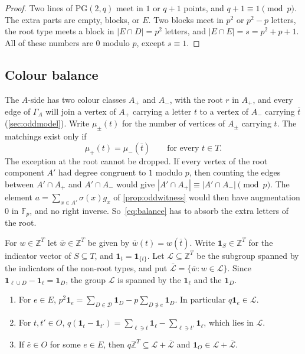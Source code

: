 \documentclass[11pt]{article}
\theoremstyle{definition}
\theoremstyle{plain}
\newcommand{\F}{\mathbb{F}}
\newcommand{\Z}{\mathbb{Z}}
\newcommand{\PG}{\mathrm{PG}}
\newcommand{\one}{\mathbf{1}}
\begin{document}
\begin{proof}
Two lines of $\PG(2,q)$ meet in $1$ or $q+1$ points, and $q+1\equiv1\pmod p$. The extra parts are empty, blocks, or $E$. Two blocks meet in $p^2$ or $p^2-p$ letters, the root type meets a block in $|E\cap D|=p^2$ letters, and $|E\cap E|=s=p^2+p+1$. All of these numbers are $0$ modulo $p$, except $s\equiv1$.
\end{proof}

\subsection{Colour balance}\label{sec:colour}

The $A$-side has two colour classes $A_+$ and $A_-$, with the root $r$ in $A_+$, and every edge of $\Gamma_A$ will join a vertex of $A_+$ carrying a letter $t$ to a vertex of $A_-$ carrying $\bar t$ (\cref{sec:oddmodel}). Write $\mu_\pm(t)$ for the number of vertices of $A_\pm$ carrying $t$. The matchings exist only if
\begin{equation}\label{eq:balance}
\mu_+(t)=\mu_-(\bar t)\qquad\text{for every }t\in T.
\end{equation}
The exception at the root cannot be dropped. If every vertex of the root component $A'$ had degree congruent to $1$ modulo $p$, then counting the edges between $A'\cap A_+$ and $A'\cap A_-$ would give $|A'\cap A_+|\equiv|A'\cap A_-|\pmod p$. The element $a=\sum_{x\in A'}\sigma(x)g_x$ of \cref{prop:oddwitness} would then have augmentation $0$ in $\F_p$, and no right inverse. So~\eqref{eq:balance} has to absorb the extra letters of the root.

For $w\in\Z^T$ let $\bar w\in\Z^T$ be given by $\bar w(t)=w(\bar t)$. Write $\one_S\in\Z^T$ for the indicator vector of $S\subseteq T$, and $\one_t=\one_{\{t\}}$. Let $\mathcal L\subseteq\Z^T$ be the subgroup spanned by the indicators of the non-root types, and put $\bar{\mathcal L}=\{\bar w:w\in\mathcal L\}$. Since $\one_{\ell\cup D}-\one_\ell=\one_D$, the group $\mathcal L$ is spanned by the $\one_\ell$ and the $\one_D$.

\begin{lemma}\label{lem:lattice}
\begin{enumerate}[label=\textup{(\alph*)},itemsep=0pt]
\item For $e\in E$, $p^2\one_e=\sum_{D\in\mathcal D}\one_D-p\sum_{D\not\ni e}\one_D$. In particular $q\one_e\in\mathcal L$.
\item For $t,t'\in O$, $q(\one_t-\one_{t'})=\sum_{\ell\ni t}\one_\ell-\sum_{\ell\ni t'}\one_\ell$, which lies in $\mathcal L$.
\item If $\bar e\in O$ for some $e\in E$, then $q\Z^T\subseteq\mathcal L+\bar{\mathcal L}$ and $\one_O\in\mathcal L+\bar{\mathcal L}$.
\end{enumerate}
\end{lemma}
\end{document}
